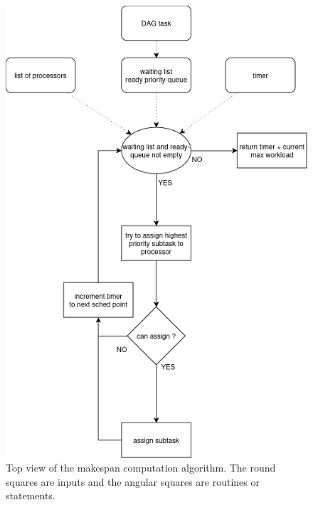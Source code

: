 \begin{figure}
    \centering
    \includegraphics[width=\linewidth]{images/makespan_computation_algorithm_global.png}
    \caption{Top view of the makespan computation algorithm.
    The round squares are inputs and the angular squares are routines or statements.}
    \label{fig:algo_makespan}
\end{figure}

